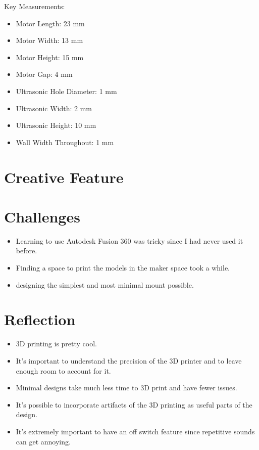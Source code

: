 \documentclass{article}
\begin{document}
	Key Measurements:
	\begin{itemize}
		\item Motor Length: 23 mm
		\item Motor Width: 13 mm
		\item Motor Height: 15 mm
		\item Motor Gap: 4 mm
		\item Ultrasonic Hole Diameter: 1 mm
		\item Ultrasonic Width: 2 mm
		\item Ultrasonic Height: 10 mm
		\item Wall Width Throughout: 1 mm
	\end{itemize}
	

	
	\clearpage
	\section{Creative Feature}
	

	\section{Challenges}
	\begin{itemize}
		\item Learning to use Autodesk Fusion 360 was tricky since I had never used it before.
		\item Finding a space to print the models in the maker space took a while.
		\item designing the simplest and most minimal mount possible.
	\end{itemize}
	
	
	\section{Reflection}
	\begin{itemize}
		\item 3D printing is pretty cool.
		\item It's important to understand the precision of the 3D printer and to leave enough room to account for it.
		\item Minimal designs take much less time to 3D print and have fewer issues.
		\item It's possible to incorporate artifacts of the 3D printing as useful parts of the design.
		\item It's extremely important to have an off switch feature since repetitive sounds can get annoying.
	\end{itemize}
	
\end{document}

